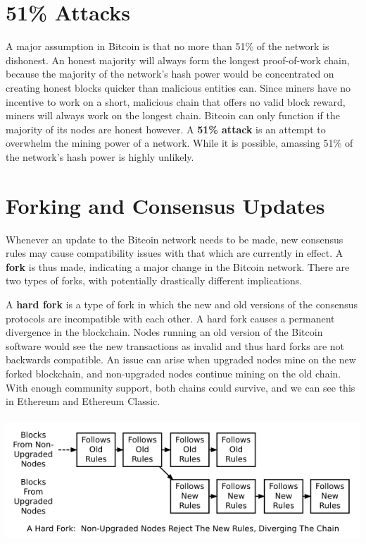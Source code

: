 \documentclass[11pt]{article}
\begin{document}
   \section*{51\% Attacks}
   
   A major assumption in Bitcoin is that no more than 51\% of the network is dishonest. An honest majority will always form the longest proof-of-work chain, because the majority of the network's hash power would be concentrated on creating honest blocks quicker than malicious entities can. Since miners have no incentive to work on a short, malicious chain that offers no valid block reward, miners will always work on the longest chain. Bitcoin can only function if the majority of its nodes are honest however. A \textbf{51\% attack} is an attempt to overwhelm the mining power of a network. While it is possible, amassing 51\% of the network's hash power is highly unlikely. 
   
   \section*{Forking and Consensus Updates}
   
   Whenever an update to the Bitcoin network needs to be made, new consensus rules may cause compatibility issues with that which are currently in effect. A \textbf{fork} is thus made, indicating a major change in the Bitcoin network. There are two types of forks, with potentially drastically different implications.
   
   A \textbf{hard fork} is a type of fork in which the new and old versions of the consensus protocols are incompatible with each other. A hard fork causes a permanent divergence in the blockchain. Nodes running an old version of the Bitcoin software would see the new transactions as invalid and thus hard forks are not backwards compatible. An issue can arise when upgraded nodes mine on the new forked blockchain, and non-upgraded nodes continue mining on the old chain. With enough community support, both chains could survive, and we can see this in Ethereum and Ethereum Classic. \\ \\
   
   \includegraphics[scale=0.9]{hard_fork} \\
\end{document}
